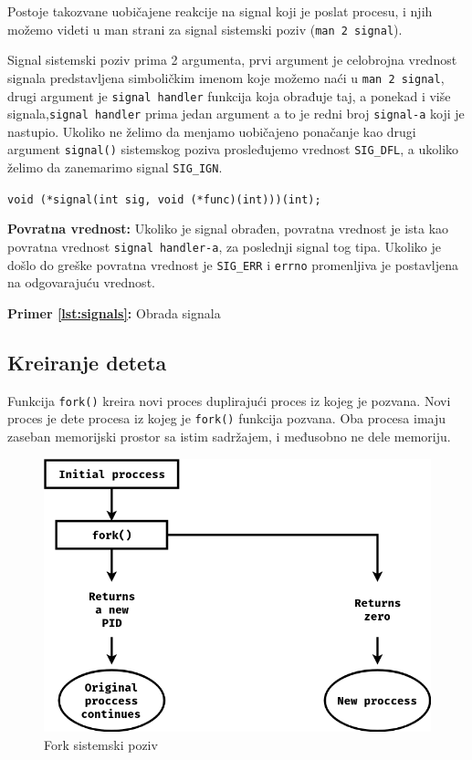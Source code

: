 \documentclass[a4paper, 11pt, twoside]{article}
\newcommand{\scode}[3] {
	\hspace{.06\textwidth} 
	\begin{minipage}[t]{.88\textwidth} %
		\begin{mdframed}[topline=true,bottomline=true,leftline=true,rightline=true,backgroundcolor=gray!22, linecolor=gray!60!black,roundcorner=1mm]
			 

	\begin{center}
		\caption{\textbf{Primer \ref{lst:#3}:} #2}
	\end{center}
	\end{mdframed}
	\end{minipage}

}
\begin{document}
Postoje takozvane uobičajene reakcije na signal koji je poslat procesu, i njih možemo videti u man strani za signal sistemski poziv (\texttt{man 2 signal}).   

Signal sistemski poziv prima 2 argumenta, prvi argument je celobrojna vrednost signala predstavljena simboličkim imenom koje možemo naći u \texttt{man 2 signal}, drugi argument je \texttt{signal handler} funkcija koja obrađuje taj, a ponekad i više signala,\texttt{signal handler} prima jedan argument a to je redni broj \texttt{signal-a} koji je nastupio. Ukoliko ne želimo da menjamo uobičajeno ponačanje kao drugi argument \texttt{signal()} sistemskog poziva prosleđujemo vrednost \texttt{SIG\_DFL}, a ukoliko želimo da zanemarimo signal \texttt{SIG\_IGN}. 

\begin{center}
	\texttt{void (*signal(int sig, void (*func)(int)))(int);}
\end{center}

\textbf{Povratna vrednost:} Ukoliko je signal obrađen, povratna vrednost je ista kao povratna vrednost \texttt{signal handler-a}, za poslednji signal tog tipa. Ukoliko je došlo do greške povratna vrednost je \texttt{SIG\_ERR} i \texttt{errno} promenljiva je postavljena na odgovarajuću vrednost.

\scode{signals.c}{Obrada signala}{signals}

\newpage
\subsection{Kreiranje deteta}

Funkcija \texttt{fork()} kreira novi proces duplirajući proces iz kojeg je pozvana. Novi proces je dete procesa iz kojeg je \texttt{fork()} funkcija pozvana. Oba procesa imaju zaseban memorijski prostor sa istim sadržajem, i međusobno ne dele memoriju.

\vspace{2mm} 
\begin{figure}[h]
	\centering
	\includegraphics[width=.48\textwidth]{fsc.png} %
	\caption{Fork sistemski poziv}
	\label{fig:fsc}
\end{figure}
\vspace{2mm} 
\end{document}
